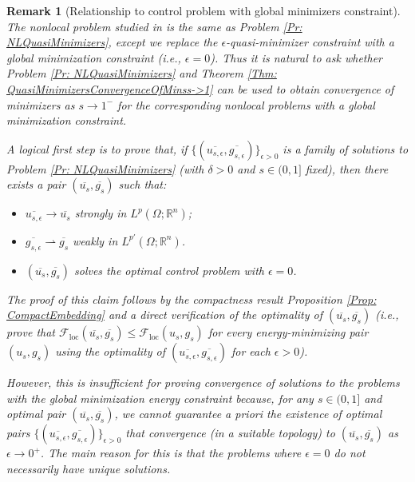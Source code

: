 \documentclass[11pt, reqno]{amsart}   	%
\theoremstyle{plain}
\numberwithin{equation}{section}
\newtheorem{remark}[thm]{Remark}
\def\de{\delta}
\def\ep{\epsilon}
\def\Om{\Omega}
\def\R{\mathbb{R}}
\def\loc{\text{loc}}
\begin{document}
\begin{remark}[Relationship to control problem with global minimizers constraint]\label{Rmk: toGlobal}
    The nonlocal problem studied in \cite{cueto2026localization} is the same as Problem \ref{Pr: NLQuasiMinimizers}, except we replace the $\ep$-quasi-minimizer constraint with a global minimization constraint (i.e., $\ep = 0$). Thus it is natural to ask whether Problem \ref{Pr: NLQuasiMinimizers} and Theorem \ref{Thm: QuasiMinimizersConvergenceOfMinss->1} can be used to obtain convergence of minimizers as $s \rightarrow 1^-$ for the corresponding nonlocal problems with a global minimization constraint. 

    A logical first step is to prove that, if $\{(\overline{u_{s, \ep}}, \overline{g_{s, \ep}})\}_{\ep > 0}$ is a family of solutions to Problem \ref{Pr: NLQuasiMinimizers} (with $\de > 0$ and $s \in (0, 1]$ fixed), then there exists a pair $(\overline{u_s}, \overline{g_s})$ such that:
    \begin{itemize}
    \item $\overline{u_{s, \ep}} \rightarrow \overline{u_s}$ strongly in $L^p(\Om; \R^n)$;
    \item $\overline{g_{s, \ep}} \rightharpoonup \overline{g_s}$ weakly in $L^{p'}(\Om; \R^n)$.
        \item $(\overline{u_s}, \overline{g_s})$ solves the optimal control problem with $\ep = 0$.
    \end{itemize}
    The proof of this claim follows by the compactness result Proposition \ref{Prop: CompactEmbedding} and a direct verification of the optimality of $(\overline{u_s}, \overline{g_s})$ (i.e., prove that $\mathcal{F}_{\loc}(\overline{u_s}, \overline{g_s}) \leq \mathcal{F}_{\loc}(u_s, g_s)$ for every energy-minimizing pair $(u_s, g_s)$ using the optimality of $(\overline{u_{s, \ep}}, \overline{g_{s, \ep}})$ for each $\ep > 0$). 

    However, this is insufficient for proving convergence of solutions to the problems with the global minimization energy constraint because, for any $s \in (0, 1]$ and optimal pair $(\overline{u_s}, \overline{g_s})$, we cannot guarantee a priori the existence of optimal pairs $\{(\overline{u_{s, \ep}}, \overline{g_{s, \ep}})\}_{\ep > 0}$ that convergence (in a suitable topology) to $(\overline{u_s}, \overline{g_s})$ as $\ep \rightarrow 0^+$. The main reason for this is that the problems where $\ep = 0$ do not necessarily have unique solutions.
\end{remark}
\end{document}
